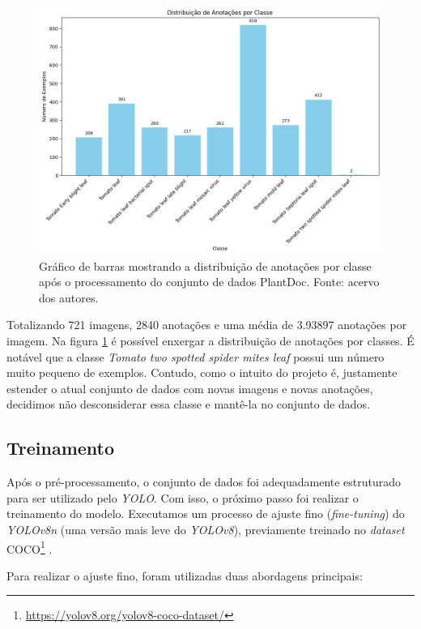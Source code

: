 \begin{figure}[htb!]
    \centering
    \includegraphics[width=1\linewidth]{images/distribuicao_anotacoes.png}
    \caption{\label{fig:distribuicao-ann-cls} Gráfico de barras mostrando a distribuição de anotações por classe após o processamento do conjunto de dados PlantDoc. Fonte: acervo dos autores.}
\end{figure}

Totalizando 721 imagens, 2840 anotações e uma média de 3.93897 anotações por imagem. Na figura \ref{fig:distribuicao-ann-cls} é possível enxergar a distribuição de anotações por classes. É notável que a classe \emph{Tomato two spotted spider mites leaf} possui um número muito pequeno de exemplos. Contudo, como o intuito do projeto é, justamente estender o atual conjunto de dados com novas imagens e novas anotações, decidimos não desconsiderar essa classe e mantê-la no conjunto de dados.

\subsection{Treinamento}
\label{sec:treinamento2}
Após o pré-processamento, o conjunto de dados foi adequadamente estruturado para ser utilizado pelo \emph{YOLO}. Com isso, o próximo passo foi realizar o treinamento do modelo. Executamos um processo de ajuste fino (\emph{fine-tuning}) do \emph{YOLOv8n} (uma versão mais leve do \emph{YOLOv8}), previamente treinado no \emph{dataset} COCO\footnote{\url{https://yolov8.org/yolov8-coco-dataset/}} \citep{COCO}.

Para realizar o ajuste fino, foram utilizadas duas abordagens principais:

